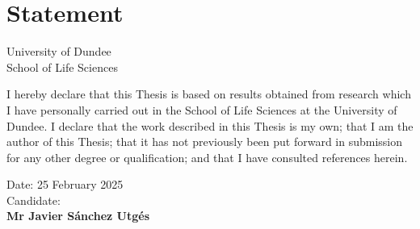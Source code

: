 \chapter*{Statement}

\begin{center}
    \LARGE University of Dundee\\[1cm]
    \LARGE School of Life Sciences\\[2cm]
\end{center}

I hereby declare that this Thesis is based on results obtained from research which I have personally carried out in the School of Life Sciences at the University of Dundee. I declare that the work described in this Thesis is my own; that I am the author of this Thesis; that it has not previously been put forward in submission for any other degree or qualification; and that I have consulted references herein.

\vfill

\begin{flushright}
    Date: 25 February 2025\\[1cm]
    Candidate:{\hspace{2cm}}
    \\[1cm]
    \textbf{Mr Javier Sánchez Utgés}
\end{flushright}